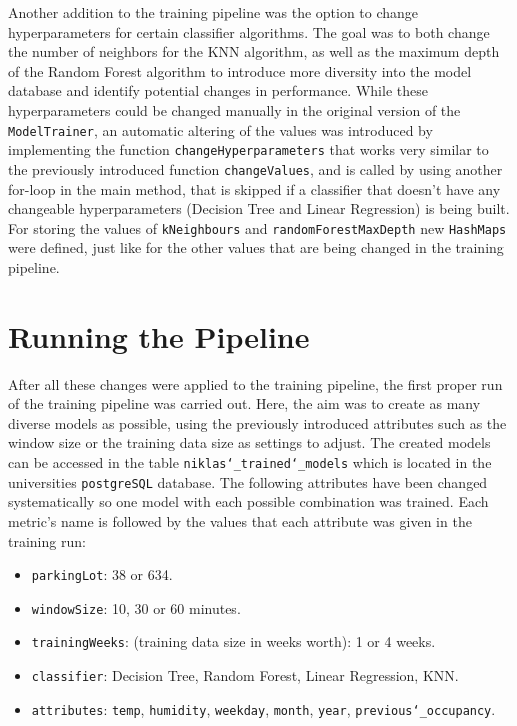  Another addition to the training pipeline was the option to change hyperparameters for certain classifier algorithms. The goal was to both change the number of neighbors for the KNN algorithm, as well as the maximum depth of the Random Forest algorithm to introduce more diversity into the model database and identify potential changes in performance. While these hyperparameters could be changed manually in the original version of the \texttt{ModelTrainer}, an automatic altering of the values was introduced by implementing the function \texttt{changeHyperparameters} that works very similar to the previously introduced function \texttt{changeValues}, and is called by using another for-loop in the main method, that is skipped if a classifier that doesn’t have any changeable hyperparameters (Decision Tree and Linear Regression) is being built. For storing the values of \texttt{kNeighbours} and \texttt{randomForestMaxDepth} new \texttt{HashMaps} were defined, just like for the other values that are being changed in the training pipeline. 
 
 
 
 \section{Running the Pipeline}
 
 After all these changes were applied to the training pipeline, the first proper run of the training pipeline was carried out. Here, the aim was to create as many diverse models as possible, using the previously introduced attributes such as the window size or the training data size as settings to adjust. The created models can be accessed in the table \texttt{niklas\char`_trained\char`_models} which is located in the universities \texttt{postgreSQL} database. The following attributes have been changed systematically so one model with each possible combination was trained. Each metric’s name is followed by the values that each attribute was given in the training run:
 
 \begin{itemize}
 	\item \texttt{parkingLot}: 38 or 634.
\item \texttt{windowSize}: 10, 30 or 60 minutes.
\item \texttt{trainingWeeks}: (training data size in weeks worth): 1 or 4 weeks. 
\item \texttt{classifier}: Decision Tree, Random Forest, Linear Regression, KNN.
\item \texttt{attributes}: \texttt{temp}, \texttt{humidity}, \texttt{weekday}, \texttt{month}, \texttt{year}, \texttt{previous\char`_occupancy}.
 \end{itemize}
 
